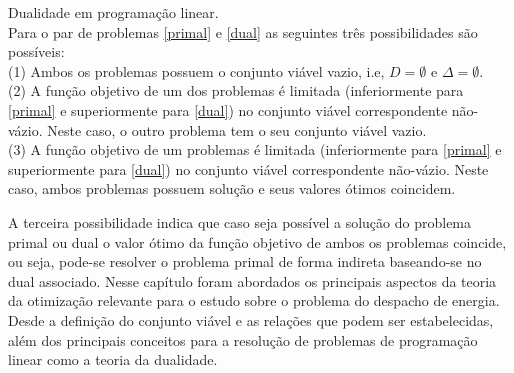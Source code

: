 	\begin{teo} 
		Dualidade em programa\c c\~ao linear.\cite{alexey}\\
		Para o par de problemas \ref{primal} e \ref{dual} as seguintes tr\^es possibilidades s\~ao poss\'iveis:\\ 
		(1) Ambos os problemas possuem o conjunto vi\'avel vazio, i.e, $D = \emptyset$ e $\Delta = \emptyset$.\\
		(2) A fun\c c\~ao objetivo de um dos problemas \'e limitada (inferiormente para \ref{primal} e superiormente para
		\ref{dual}) no conjunto vi\'avel correspondente n\~ao-v\'azio. Neste caso, o outro problema tem o seu conjunto vi\'avel
		vazio.\\
		(3) A fun\c c\~ao objetivo de um problemas \'e limitada (inferiormente para \ref{primal} e superiormente para
		\ref{dual}) no conjunto vi\'avel correspondente n\~ao-v\'azio. Neste caso, ambos problemas possuem solu\c c\~ao e seus
		valores \'otimos coincidem.
	\end{teo}
A terceira possibilidade indica que caso seja poss\'ivel a solu\c c\~ao do problema primal ou dual o valor \'otimo da
fun\c c\~ao objetivo de ambos os problemas
coincide, ou seja, pode-se resolver o problema primal de forma indireta baseando-se no dual associado. Nesse cap\'itulo
foram abordados os principais aspectos da teoria da otimiza\c c\~ao relevante  para o estudo sobre o problema do
despacho de energia. Desde a defini\c c\~ao do conjunto vi\'avel e as rela\c c\~oes que podem ser estabelecidas, al\'em
dos principais conceitos para a resolu\c c\~ao de problemas de programa\c c\~ao linear como a teoria da
dualidade.

